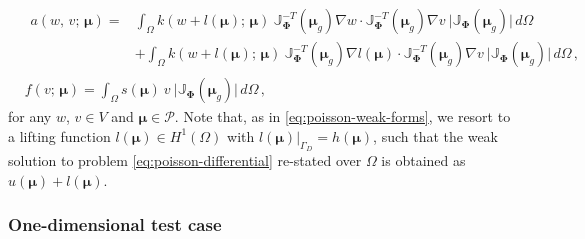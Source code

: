 \documentclass[longtitle]{elsarticle}
\numberwithin{equation}{section}
\theoremstyle{theorem}
\theoremstyle{definition}
\theoremstyle{remark}
\theoremstyle{proposition}
\numberwithin{figure}{section}
\newcommand{\bg}[1]{\boldsymbol{#1}}
\begin{document}
		\begin{equation*}
			\label{eq:poisson-weak-forms-reference}
			\begin{aligned}
				&
				\begin{aligned}
				a(w, \, v; \, \bg{\mu}) = & \int_{\Omega} k(w + l(\bg{\mu}); \, \bg{\mu}) ~ \mathbb{J}^{-T}_{\bg{\Phi}}(\bg{\mu}_g) \nabla w \cdot \mathbb{J}^{-T}_{\bg{\Phi}}(\bg{\mu}_g) \nabla v ~ \lvert \mathbb{J}_{\bg{\Phi}}(\bg{\mu}_g) \rvert \, d \Omega \\[0.1cm]
				& + \int_{\Omega} k(w + l(\bg{\mu}); \, \bg{\mu}) ~ \mathbb{J}^{-T}_{\bg{\Phi}}(\bg{\mu}_g) \nabla l(\bg{\mu}) \cdot \mathbb{J}^{-T}_{\bg{\Phi}}(\bg{\mu}_g) \nabla v ~ \lvert \mathbb{J}_{\bg{\Phi}}(\bg{\mu}_g) \rvert \, d \Omega \, ,
				\end{aligned} \\[0.2cm]
				& f(v; \, \bg{\mu}) = \int_{\Omega} s(\bg{\mu}) ~ v ~ \lvert \mathbb{J}_{\bg{\Phi}}(\bg{\mu}_g) \rvert \, d \Omega \, ,  
			\end{aligned}
		\end{equation*}
		for any $w$, $v \in V$ and $\bg{\mu} \in \mathcal{P}$. Note that, as in \eqref{eq:poisson-weak-forms}, we resort to a lifting function $l(\bg{\mu}) \in H^1(\Omega)$ with $l(\bg{\mu}) \big\rvert_{\Gamma_D} = h(\bg{\mu})$, such that the weak solution to problem \eqref{eq:poisson-differential} re-stated over $\Omega$ is obtained as $u(\bg{\mu}) + l(\bg{\mu})$.
		
		
		
	\subsubsection{One-dimensional test case}
	\label{section:One-dimensional test case}
	
\end{document}
